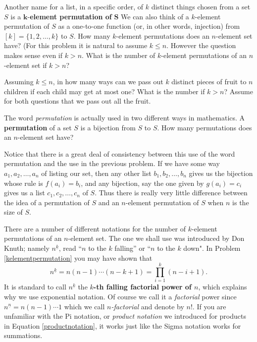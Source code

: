 \iteme Another name for a list, in a specific order, of $k$ distinct things
chosen from a set $S$ is a  $\mathbf k$-{\bf element permutation of}
$\mathbf S$  We can also think of a $k$-element permutation of $S$ as a
one-to-one function (or, in other words, injection) from
$[k]=\{1,2,\ldots, k\}$ to $S$.  How many $k$-element permutations does an
$n$-element set have?\label{kelementpermutation}  (For this problem it is
natural to assume $k\le n$.  However the question makes sense even if $k>n$. 
What is the number of $k$-element permutations of an $n$-element set if $k>n$?

\iteme  Assuming $k\le n$, in how many ways can we pass out  $k$
distinct pieces of fruit to
$n$ children if each child may get at most one?  What is the number if
$k>n$?  Assume for both questions that we pass out all the fruit.

\iteme The word {\em permutation} is actually used in two different ways in
mathematics.  A {\bf permutation} of a set
$S$ is a bijection from $S$ to
$S$.  How many permutations does an $n$-element set have?
\label{permutationasbijection}
\ep 

Notice that
there is a great deal of consistency between this use of the word permutation
and the use in the previous problem.  If we have some way
$a_1,a_2,\ldots,a_n$ of listing our set, then any other list
$b_1,b_2,\ldots,b_n$ gives us the bijection whose rule is $f(a_i) =b_i$, and
any bijection, say the one given by $g(a_i)=c_i$ gives us a list
$c_1,c_2,\ldots,c_n$ of $S$.  Thus there is really very little difference
between the idea of a permutation of $S$ and an
$n$-element permutation of $S$ when $n$ is the size of $S$.

There are a number of different notations for the number of $k$-element
permutations of an $n$-element set.  The one we shall use was introduced by
Don Knuth; namely $n^{\underline{k}}$, read ``$n$ to the $k$ falling'' or
``$n$ to the $k$ down". In Problem \ref{kelementpermutation} you may have
shown that 
\begin{equation}n^{\underline{k}} =n(n-1)\cdots (n-k+1)= \prod_{i=1}^k(
n-i+1).\label{productnotation}
\end{equation}
  It is standard to call $n^{\underline{k}}$  the
{\bf
$k$-th falling factorial power of $n$}, which explains why we use exponential
notation.  Of course we call it a {\em factorial} power since
$n^{\underline{n}} = n(n-1)\cdots 1$ which we call {\em $n$-factorial} and
denote by
$n!$.  If you are unfamiliar with the Pi
notation, or {\em product notation} we introduced for products in Equation
\ref{productnotation}, it works just like the Sigma notation works for
summations.

